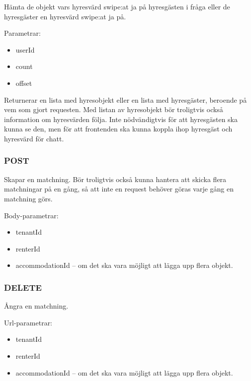 \documentclass{article}
\begin{document}
Hämta de objekt vars hyresvärd swipe:at ja på hyresgästen i fråga eller de hyresgäster en hyresvärd swipe:at ja på.

Parametrar:

\begin{itemize}
    \item userId 
    \item count
    \item offset
\end{itemize}

Returnerar en lista med hyresobjekt eller en lista med hyresgäster, beroende på vem som gjort requesten. Med listan av hyresobjekt bör troligtvis också
information om hyresvärden följa. Inte nödvändigtvis för att hyresgästen ska kunna se den, men för att frontenden ska kunna koppla ihop hyresgäst och
hyresvärd för chatt.

\subsubsection {POST}
\label{ssub:POST}

Skapar en matchning. Bör troligtvis också kunna hantera att skicka flera matchningar på en gång, så att inte en request behöver göras varje gång en
matchning görs.

Body-parametrar:

\begin{itemize}
    \item tenantId
    \item renterId
    \item accommodationId -- om det ska vara möjligt att lägga upp flera objekt.
\end{itemize}

\subsubsection {DELETE}
\label{ssub:DELETE}

Ångra en matchning.

Url-parametrar:

\begin{itemize}
    \item tenantId
    \item renterId
    \item accommodationId -- om det ska vara möjligt att lägga upp flera objekt.
\end{itemize}
\end{document}
